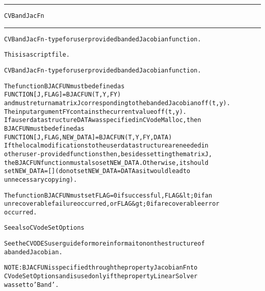 \begin{samepage}
\hrule
\begin{center}
{\large \verb!CVBandJacFn!}
\label{p:CVBandJacFn}
\end{center}
\hrule\vspace{0.1in}



\begin{alltt}
CVBandJacFn - type for user provided banded Jacobian function.
\end{alltt}

\end{samepage}



\begin{samepage}


\begin{alltt}
This is a script file. 
\end{alltt}

\end{samepage}



\begin{alltt}
CVBandJacFn - type for user provided banded Jacobian function.

   The function BJACFUN must be defined as 
        FUNCTION [J, FLAG] = BJACFUN(T, Y, FY)
   and must return a matrix J corresponding to the banded Jacobian of f(t,y).
   The input argument FY contains the current value of f(t,y).
   If a user data structure DATA was specified in CVodeMalloc, then
   BJACFUN must be defined as
        FUNCTION [J, FLAG, NEW_DATA] = BJACFUN(T, Y, FY, DATA)
   If the local modifications to the user data structure are needed in
   other user-provided functions then, besides setting the matrix J,
   the BJACFUN function must also set NEW_DATA. Otherwise, it should 
   set NEW_DATA=[] (do not set NEW_DATA = DATA as it would lead to 
   unnecessary copying).

   The function BJACFUN must set FLAG=0 if successful, FLAG&lt;0 if an
   unrecoverable failure occurred, or FLAG&gt;0 if a recoverable error
   occurred.

   See also CVodeSetOptions

   See the CVODES user guide for more informaiton on the structure of
   a banded Jacobian.

   NOTE: BJACFUN is specified through the property JacobianFn to
   CVodeSetOptions and is used only if the property LinearSolver
   was set to 'Band'.
\end{alltt}






\vspace{0.1in}